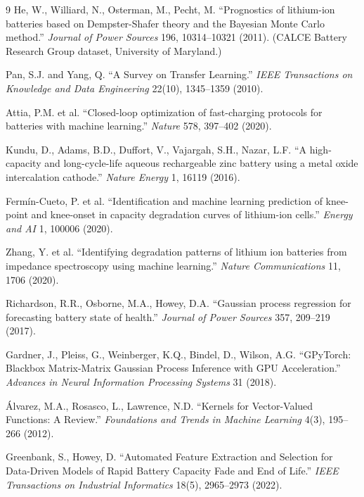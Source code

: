 \documentclass[12pt]{article}
\begin{document}
\begin{thebibliography}{9}
He, W., Williard, N., Osterman, M., Pecht, M.
``Prognostics of lithium-ion batteries based on Dempster-Shafer theory
and the Bayesian Monte Carlo method.''
\textit{Journal of Power Sources} 196, 10314--10321 (2011).
(CALCE Battery Research Group dataset, University of Maryland.)

Pan, S.J. and Yang, Q.
``A Survey on Transfer Learning.''
\textit{IEEE Transactions on Knowledge and Data Engineering} 22(10), 1345--1359 (2010).

Attia, P.M. et al.
``Closed-loop optimization of fast-charging protocols for batteries with machine learning.''
\textit{Nature} 578, 397--402 (2020).

Kundu, D., Adams, B.D., Duffort, V., Vajargah, S.H., Nazar, L.F.
``A high-capacity and long-cycle-life aqueous rechargeable zinc battery using a metal oxide intercalation cathode.''
\textit{Nature Energy} 1, 16119 (2016).

Ferm{\'i}n-Cueto, P. et al.
``Identification and machine learning prediction of knee-point and knee-onset in capacity degradation curves of lithium-ion cells.''
\textit{Energy and AI} 1, 100006 (2020).

Zhang, Y. et al.
``Identifying degradation patterns of lithium ion batteries from impedance spectroscopy using machine learning.''
\textit{Nature Communications} 11, 1706 (2020).

Richardson, R.R., Osborne, M.A., Howey, D.A.
``Gaussian process regression for forecasting battery state of health.''
\textit{Journal of Power Sources} 357, 209--219 (2017).

Gardner, J., Pleiss, G., Weinberger, K.Q., Bindel, D., Wilson, A.G.
``GPyTorch: Blackbox Matrix-Matrix Gaussian Process Inference with GPU Acceleration.''
\textit{Advances in Neural Information Processing Systems} 31 (2018).

{\'A}lvarez, M.A., Rosasco, L., Lawrence, N.D.
``Kernels for Vector-Valued Functions: A Review.''
\textit{Foundations and Trends in Machine Learning} 4(3), 195--266 (2012).

Greenbank, S., Howey, D.
``Automated Feature Extraction and Selection for Data-Driven Models of Rapid Battery Capacity Fade and End of Life.''
\textit{IEEE Transactions on Industrial Informatics} 18(5), 2965--2973 (2022).


\end{thebibliography}
\end{document}
